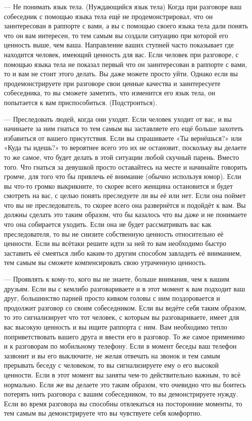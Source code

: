--- Не понимать язык тела. (Нуждающийся язык тела) Когда при разговоре ваш собеседник с помощью языка тела ещё не продемонстрировал, что он заинтересован в раппорте с вами, а вы с помощью своего языка тела дали понять что он вам интересен, то тем самым вы создали ситуацию при которой его ценность выше, чем ваша. Направление ваших ступней часто показывает где находится человек, имеющий ценность для вас. Если человек при разговоре, с помощью языка тела не показал первый что он заинтересован в раппорте с вами, то и вам не стоит этого делать. Вы даже можете просто уйти. Однако если вы продемонстрируете при разговоре свои ценные качества и заинтересуете собеседника, то вы сможете заметить, что изменится его язык тела, он попытается к вам приспособиться. (Подстроиться).

--- Преследовать людей, когда они уходят. Если человек уходит от вас, и вы начинаете за ним гнаться то тем самым вы заставляете его ещё больше захотеть избавиться от вашего присутствия. Если вы спрашиваете «Ты вернёшься?» или «Куда ты идешь?» то вероятнее всего это их не остановит, поскольку вы делаете то же самое, что будет делать в этой ситуации любой скучный парень. Вместо того. Что гнаться за девушкой просто оставайтесь на месте и начинайте говорить громче, для того что бы привлечь её внимание (обычно используя юмор). Если вы что-то громко выкрикните, то скорее всего женщина остановится и будет смотреть на вас, с целью понять преследуете ли вы её или нет. Если она поймет что вы не преследователь, то скорее всего она развернётся и подойдёт к вам. Вы должны сделать это таким образом, что бы казалось что вы даже и не понимаете что она собирается уходить. Если она не будет рассматривать вас как преследователя, то вы не снизите собственную ценность относительно её ценности. Если вы всётаки решите идти за ней то вам необходимо быстро заставить её смеяться либо каким-то другим способом завладеть её вниманием, тем самым вы сможете компенсировать свою утраченную ценность.

--- Проявлять к кому-то, кого вы не знаете, больше внимания, чем к вашим друзьям. Если вы с кемлибо разговариваете и в этот момент к вам подходит ваш друг, большинство парней просто кивком головы с ним поздоровается и продолжит разговор со своим собеседником. Если вы ведёте себя таким образом, то это сигнализирует что тот человек, с которым вы разговариваете, имеет для вас высокую ценность и вы ищите раппорта с ним. Вам необходимо тепло поприветствовать вашего друга и ввести его в разговор. То же самое применимо и к разговорам по мобильному телефону. Если в момент беседы ваш телефон зазвонит и вы его выключите, не желая отвечать на звонок и тем самым прерывать беседу с человеком, то вы сигнализируете ему о его высокой ценности. Если в этот момент вы заняты чем-то действительно важным, то всё нормально. Если же вы делаете это таким образом, что очевидно что вы боитесь потерять нить разговора с вашим собеседником, то вы демонстрируете нужду. Если во время разговора вы способны отвлекаться на посторонние моменты, то тем самым вы демонстрируете что вы чувствуете себя комфортно.


